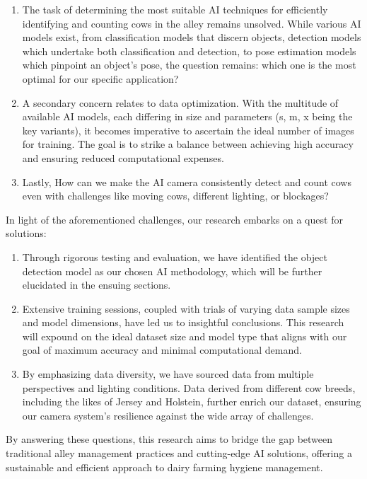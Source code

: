 \begin{enumerate}
    \item The task of determining the most suitable AI techniques for efficiently identifying and counting cows in the alley remains unsolved. While various AI models exist, from classification models that discern objects, detection models which undertake both classification and detection, to pose estimation models which pinpoint an object's pose, the question remains: which one is the most optimal for our specific application?

    \item A secondary concern relates to data optimization. With the multitude of available AI models, each differing in size and parameters (s, m, x being the key variants), it becomes imperative to ascertain the ideal number of images for training. The goal is to strike a balance between achieving high accuracy and ensuring reduced computational expenses.
    
    \item Lastly, How can we make the AI camera consistently detect and count cows  even with challenges like moving cows, different lighting, or blockages?
\end{enumerate}

In light of the aforementioned challenges, our research embarks on a quest for solutions:

\begin{enumerate}
    \item Through rigorous testing and evaluation, we have identified the object detection model as our chosen AI methodology, which will be further elucidated in the ensuing sections.

    \item Extensive training sessions, coupled with trials of varying data sample sizes and model dimensions, have led us to insightful conclusions. This research will expound on the ideal dataset size and model type that aligns with our goal of maximum accuracy and minimal computational demand.

    \item By emphasizing data diversity, we have sourced data from multiple perspectives and lighting conditions. Data derived from different cow breeds, including the likes of Jersey and Holstein, further enrich our dataset, ensuring our camera system's resilience against the wide array of challenges.
\end{enumerate}
By answering these questions, this research aims to bridge the gap between traditional alley management practices and cutting-edge AI solutions, offering a sustainable and efficient approach to dairy farming hygiene management.





